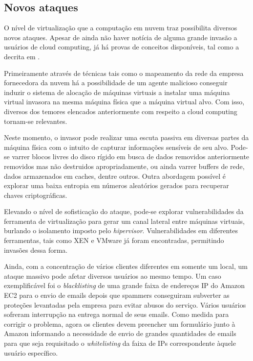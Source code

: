 \documentclass[brazil,12pt]{article}
\begin{document}
\subsection{Novos ataques}
O nível de virtualização que a computação em nuvem traz possibilita diversos
novos ataques. Apesar de ainda não haver notícia de alguma grande invasão a
usuários de cloud computing, já há provas de conceitos disponíveis, tal como a
decrita em \cite{hey-you-get-off-of-my-cloud}.

Primeiramente através de técnicas tais como o mapeamento da rede da empresa
fornecedora da nuvem há a possibilidade de um agente malicioso conseguir
induzir o sistema de alocação de máquinas virtuais a instalar uma máquina
virtual invasora na mesma máquina física que a máquina virtual alvo. Com isso,
diversos dos temores elencados anteriormente com respeito a cloud computing
tornam-se relevantes.

Neste momento, o invasor pode realizar uma escuta passiva em diversas partes da
máquina física com o intuito de capturar informações sensíveis de seu alvo.
Pode-se varrer blocos livres do disco rígido em busca de dados removidos
anteriormente removidos mas não destruidos apropriadamente, ou ainda varrer
buffers de rede, dados armazenados em caches, dentre outros. Outra abordagem
possível é explorar uma baixa entropia em números aleatórios gerados para
recuperar chaves criptográficas.

Elevando o nível de sofisticação do ataque, pode-se explorar vulnerabilidades da
ferramenta de virtualização para gerar um canal lateral entre máquinas
virtuais, burlando o isolamento imposto pelo \emph{hipervisor}. Vulnerabilidades
em diferentes ferramentas, tais como XEN e VMware já foram encontradas,
permitindo invasões dessa forma. \cite{controlling-data-in-cloud}

Ainda, com a concentração de vários clientes diferentes em somente um local, um
ataque massivo pode afetar diversos usuários ao mesmo tempo. Um caso
exemplificável foi o \emph{blacklisting} de uma grande faixa de endereços IP do
Amazon EC2 para o envio de emails depois que spammers conseguiram subverter as
proteções levantadas pela empresa para evitar abusos do serviço. Vários usuários
sofreram interrupção na entrega normal de seus emails. Como medida para corrigir
o problema, agora os clientes devem preencher um formulário junto à Amazon
informando a necessidade de envio de grandes quantidades de emails para que seja
requisitado o \emph{whitelisting} da faixa de IPs correspondente àquele usuário
específico. \cite{above-clouds} \cite{whats-new-about-cloud-security}
\end{document}
